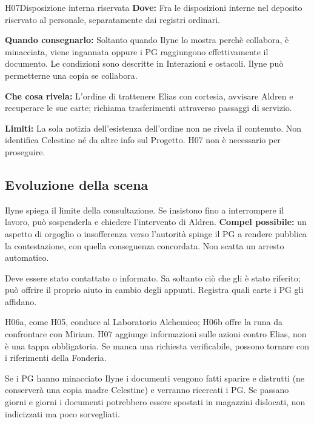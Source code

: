\documentclass[11pt,a4paper]{article}
\begin{document}
{}
\begin{handoutbox}{H07}{Disposizione interna riservata}
\textbf{Dove:} Fra le disposizioni interne nel deposito riservato al personale, separatamente dai registri ordinari.

\textbf{Quando consegnarlo:} Soltanto quando Ilyne lo mostra perchè collabora, è minacciata, viene ingannata oppure i PG raggiungono effettivamente il documento. Le condizioni sono descritte in Interazioni e ostacoli. Ilyne può permetterne una copia se collabora.

\textbf{Che cosa rivela:} L'ordine di trattenere Elias con cortesia, avvisare Aldren e recuperare le sue carte; richiama trasferimenti attraverso passaggi di servizio.

\textbf{Limiti:} La sola notizia dell'esistenza dell'ordine non ne rivela il contenuto. Non identifica Celestine né da altre info sul Progetto. H07 non è necessario per proseguire.
\end{handoutbox}

\subsection{Evoluzione della scena}
\begin{description}[leftmargin=5mm,style=nextline]
\item[I PG contestano pubblicamente una restrizione.]
Ilyne spiega il limite della consultazione. Se insistono fino a interrompere il lavoro, può sospenderla e chiedere l'intervento di Aldren. \textbf{Compel possibile:} un aspetto di orgoglio o insofferenza verso l'autorità spinge il PG a rendere pubblica la contestazione, con quella conseguenza concordata. Non scatta un arresto automatico.
\item[Aldren interviene.]
Deve essere stato contattato o informato. Sa soltanto ciò che gli è stato riferito; può offrire il proprio aiuto in cambio degli appunti. Registra quali carte i PG gli affidano.
\item[I PG rinunciano a H07 o lasciano l'Archivio.]
H06a, come H05, conduce al Laboratorio Alchemico; H06b offre la runa da confrontare con Miriam. H07 aggiunge informazioni sulle azioni contro Elias, non è una tappa obbligatoria. Se manca una richiesta verificabile, possono tornare con i riferimenti della Fonderia.
\end{description}

\begin{clockbox}
Se i PG hanno minacciato Ilyne i documenti vengono fatti sparire e distrutti (ne conserverà una copia madre Celestine) e verranno ricercati i PG. Se passano giorni e giorni i documenti potrebbero essere spostati in magazzini dislocati, non indicizzati ma poco sorvegliati.
\end{clockbox}
\end{document}
